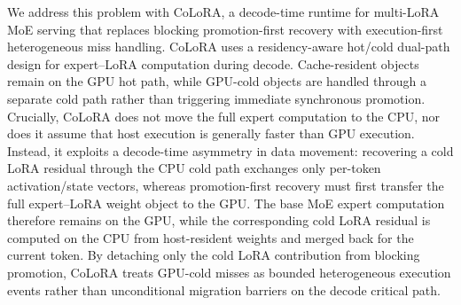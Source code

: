 \documentclass[sigplan,anonymous,review,nonacm]{acmart}
\begin{document}
We address this problem with CoLoRA, a decode-time runtime for multi-LoRA MoE serving that replaces blocking promotion-first recovery with execution-first heterogeneous miss handling. CoLoRA uses a residency-aware hot/cold dual-path design for expert--LoRA computation during decode. Cache-resident objects remain on the GPU hot path, while GPU-cold objects are handled through a separate cold path rather than triggering immediate synchronous promotion. Crucially, CoLoRA does not move the full expert computation to the CPU, nor does it assume that host execution is generally faster than GPU execution. Instead, it exploits a decode-time asymmetry in data movement: recovering a cold LoRA residual through the CPU cold path exchanges only per-token activation/state vectors, whereas promotion-first recovery must first transfer the full expert--LoRA weight object to the GPU. The base MoE expert computation therefore remains on the GPU, while the corresponding cold LoRA residual is computed on the CPU from host-resident weights and merged back for the current token. By detaching only the cold LoRA contribution from blocking promotion, CoLoRA treats GPU-cold misses as bounded heterogeneous execution events rather than unconditional migration barriers on the decode critical path.
\end{document}

